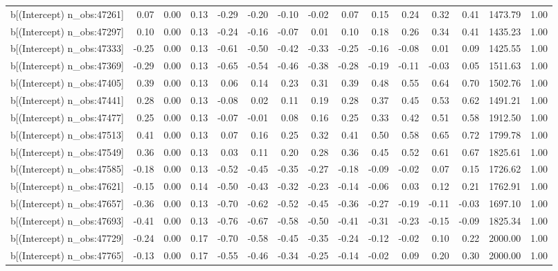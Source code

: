 \begin{table}[ht]
\begin{tabular}{rrrrrrrrrrrrrrr}
  b[(Intercept) n\_obs:47261] & 0.07 & 0.00 & 0.13 & -0.29 & -0.20 & -0.10 & -0.02 & 0.07 & 0.15 & 0.24 & 0.32 & 0.41 & 1473.79 & 1.00 \\ 
  b[(Intercept) n\_obs:47297] & 0.10 & 0.00 & 0.13 & -0.24 & -0.16 & -0.07 & 0.01 & 0.10 & 0.18 & 0.26 & 0.34 & 0.41 & 1435.23 & 1.00 \\ 
  b[(Intercept) n\_obs:47333] & -0.25 & 0.00 & 0.13 & -0.61 & -0.50 & -0.42 & -0.33 & -0.25 & -0.16 & -0.08 & 0.01 & 0.09 & 1425.55 & 1.00 \\ 
  b[(Intercept) n\_obs:47369] & -0.29 & 0.00 & 0.13 & -0.65 & -0.54 & -0.46 & -0.38 & -0.28 & -0.19 & -0.11 & -0.03 & 0.05 & 1511.63 & 1.00 \\ 
  b[(Intercept) n\_obs:47405] & 0.39 & 0.00 & 0.13 & 0.06 & 0.14 & 0.23 & 0.31 & 0.39 & 0.48 & 0.55 & 0.64 & 0.70 & 1502.76 & 1.00 \\ 
  b[(Intercept) n\_obs:47441] & 0.28 & 0.00 & 0.13 & -0.08 & 0.02 & 0.11 & 0.19 & 0.28 & 0.37 & 0.45 & 0.53 & 0.62 & 1491.21 & 1.00 \\ 
  b[(Intercept) n\_obs:47477] & 0.25 & 0.00 & 0.13 & -0.07 & -0.01 & 0.08 & 0.16 & 0.25 & 0.33 & 0.42 & 0.51 & 0.58 & 1912.50 & 1.00 \\ 
  b[(Intercept) n\_obs:47513] & 0.41 & 0.00 & 0.13 & 0.07 & 0.16 & 0.25 & 0.32 & 0.41 & 0.50 & 0.58 & 0.65 & 0.72 & 1799.78 & 1.00 \\ 
  b[(Intercept) n\_obs:47549] & 0.36 & 0.00 & 0.13 & 0.03 & 0.11 & 0.20 & 0.28 & 0.36 & 0.45 & 0.52 & 0.61 & 0.67 & 1825.61 & 1.00 \\ 
  b[(Intercept) n\_obs:47585] & -0.18 & 0.00 & 0.13 & -0.52 & -0.45 & -0.35 & -0.27 & -0.18 & -0.09 & -0.02 & 0.07 & 0.15 & 1726.62 & 1.00 \\ 
  b[(Intercept) n\_obs:47621] & -0.15 & 0.00 & 0.14 & -0.50 & -0.43 & -0.32 & -0.23 & -0.14 & -0.06 & 0.03 & 0.12 & 0.21 & 1762.91 & 1.00 \\ 
  b[(Intercept) n\_obs:47657] & -0.36 & 0.00 & 0.13 & -0.70 & -0.62 & -0.52 & -0.45 & -0.36 & -0.27 & -0.19 & -0.11 & -0.03 & 1697.10 & 1.00 \\ 
  b[(Intercept) n\_obs:47693] & -0.41 & 0.00 & 0.13 & -0.76 & -0.67 & -0.58 & -0.50 & -0.41 & -0.31 & -0.23 & -0.15 & -0.09 & 1825.34 & 1.00 \\ 
  b[(Intercept) n\_obs:47729] & -0.24 & 0.00 & 0.17 & -0.70 & -0.58 & -0.45 & -0.35 & -0.24 & -0.12 & -0.02 & 0.10 & 0.22 & 2000.00 & 1.00 \\ 
  b[(Intercept) n\_obs:47765] & -0.13 & 0.00 & 0.17 & -0.55 & -0.46 & -0.34 & -0.25 & -0.14 & -0.02 & 0.09 & 0.20 & 0.30 & 2000.00 & 1.00 \\ 

\end{tabular}
\end{table}
